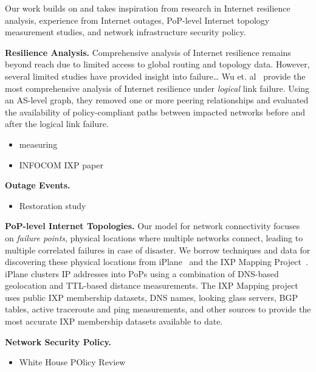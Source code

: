 Our work builds on and takes inspiration from research in Internet resilience analysis, experience from Internet outages, PoP-level Internet topology measurement studies, and network infrastructure security policy.

{\bf Resilience Analysis.}
    Comprehensive analysis of Internet resilience remains beyond reach due to limited access to global routing and topology data. 
    However, several limited studies have provided insight into failure\ldots{}
    Wu et. al~\cite{michigan} provide the most comprehensive analysis of Internet resilience under {\it logical} link failure.
    Using an AS-level graph, they removed one or more peering relationships and evaluated the availability of policy-compliant paths between impacted networks before and after the logical link failure.
    
    \begin{itemize}
        \item measuring~\cite{measuringresilience}
        \item INFOCOM IXP paper~\cite{ixp-routingdiversity} 
    \end{itemize}

{\bf Outage Events.}
\begin{itemize}
    \item Restoration study~\cite{taiwan}
\end{itemize}

{\bf PoP-level Internet Topologies.}
    Our model for network connectivity focuses on {\it failure points}, physical locations where multiple networks connect, leading to multiple correlated failures in case of disaster.
    We borrow techniques and data for discovering these physical locations from iPlane~\cite{iplane} and the IXP Mapping Project~\cite{ixps-mapped}.
    iPlane clusters IP addresses into PoPs using a combination of DNS-based geolocation and TTL-based distance measurements.
    The IXP Mapping project uses public IXP membership datasets, DNS names, looking glass servers, BGP tables, active traceroute and ping measurements, and other sources to provide the most accurate IXP membership datasets available to date. 

{\bf Network Security Policy.}
    \begin{itemize}
        \item White House POlicy Review~\cite{cyberspacepolicy} 
    \end{itemize}
